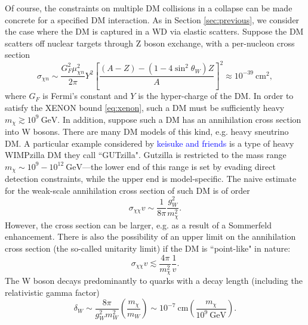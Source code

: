 \documentclass[preprintnumbers,amsmath,amssymb,prd,superscriptaddress]{revtex4}
\newcommand{\GeV}{\text{GeV}}
\newcommand{\cm}{\text{cm}}
\def\r{\right)}
\def\l{\left(}
\begin{document}
Of course, the constraints on multiple DM collisions in a collapse can be made concrete for a specified DM interaction. 
As in Section \ref{sec:previous}, we consider the case where the DM is captured in a WD via elastic scatters. 
Suppose the DM scatters off nuclear targets through Z boson exchange, with a per-nucleon cross section
\begin{equation}
\label{eq:Zscattering}
\sigma_{\chi n} \sim \frac{G_F^2 \mu_{\chi n}^2}{2\pi} Y^2 \left [\frac{(A-Z) - (1-4 \sin^2{\theta_W})Z}{A} \right ]^2 \approx 10^{-39} ~\cm^2,
\end{equation}
where $G_F$ is Fermi's constant and $Y$ is the hyper-charge of the DM. 
In order to satisfy the XENON bound \eqref{eq:xenon}, such a DM must be sufficiently heavy $m_\chi \gtrsim 10^9 ~\GeV$. 
In addition, suppose such a DM has an annihilation cross section into W bosons.
There are many DM models of this kind, e.g. heavy sneutrino DM. 
A particular example considered by \textcolor{blue}{keisuke and friends} is a type of heavy WIMPzilla DM they call ``GUTzilla".
Gutzilla is restricted to the mass range $m_\chi \sim 10^{9} - 10^{12} ~\GeV$---the lower end of this range is set by evading direct detection constraints, while the upper end is model-specific.
The naive estimate for the weak-scale annihilation cross section of such DM is of order
\begin{equation}
\sigma_{\chi \chi} v \sim \frac{1}{8\pi} \frac{g_W^2}{m_\chi^2}.
\end{equation}
However, the cross section can be larger, e.g. as a result of a Sommerfeld enhancement. 
There is also the possibility of an upper limit on the annihilation cross section (the so-called unitarity limit) if the DM is ``point-like" in nature:
\begin{equation}
\sigma_{\chi \chi} v \lesssim \frac{4 \pi}{m_\chi^2} \frac{1}{v}.
\end{equation}
The W boson decays predominantly to quarks with a decay length (including the relativistic gamma factor)
\begin{equation}
\delta_W \sim \frac{8\pi}{g_W^2 m_W^2} \l \frac{m_\chi}{m_W} \r \sim 10^{-7} ~\cm \l \frac{m_\chi}{10^{9} ~\GeV} \r. 
\end{equation} 
\end{document}
